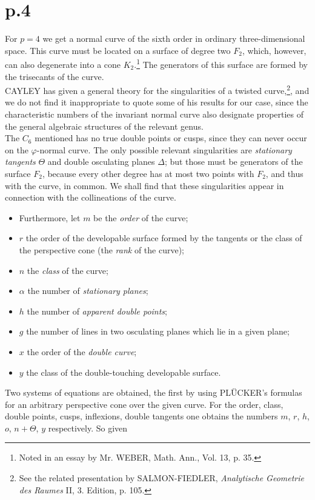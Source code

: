 \documentclass[leqno]{article}
\begin{document}
\section{p.4}
For $ p = 4 $ we get a normal curve of the sixth order in ordinary three-dimensional space. This curve must be located on a surface of degree two $ F_2 $, which, however, can also degenerate into a cone $ K_2 $.\footnote{Noted in an essay by Mr. WEBER, Math. Ann., Vol. 13, p. 35.} The generators of this surface are formed by the trisecants of the curve. \\
CAYLEY has given a general theory for the singularities of a twisted curve,\footnote{See the related presentation by SALMON-FIEDLER, \textit{Analytische Geometrie des Raumes} II, 3. Edition, p. 105.}, and we do not find it inappropriate to quote some of his results for our case, since the characteristic numbers of the invariant normal curve also designate properties of the general algebraic structures of the relevant genus. \\
The $C_6$ mentioned has no true double points or cusps, since they can never occur on the $\varphi$-normal curve. The only possible relevant singularities are \textit{stationary tangents} $\Theta$ and double osculating planes $\Delta$; but those must be generators of the surface $ F_2 $, because every other degree has at most two points with $ F_2 $, and thus with the curve, in common. We shall find that these singularities appear in connection with the collineations of the curve. 
\begin{itemize}[label={}]
	\item Furthermore, let $ m $ be the  \textit{order} of the curve; 
	\item $ r $ the order of the developable surface formed by the tangents or the class of the perspective cone (the \textit{rank} of the curve);
	\item $ n $ the \textit{class} of the curve;
	\item $\alpha$ the number of \textit{stationary planes};
	\item $ h $ the number of \textit{apparent double points};
	\item $ g $ the number of lines in two osculating planes which lie in a given plane;
	\item $ x $ the order of the \textit{double curve};
	\item $ y $ the class of the double-touching developable surface.
\end{itemize}
Two systems of equations are obtained, the first by using PL\"UCKER's formulas for an arbitrary perspective cone over the given curve. For the order, class, double points, cusps, inflexions, double tangents one obtains the numbers $ m $, $ r $, $ h $, $ o $, $ n + \Theta $, $ y $ respectively. So given
\end{document}
